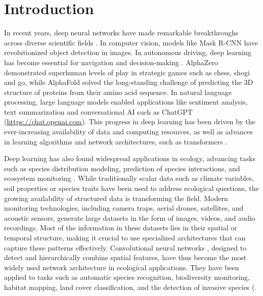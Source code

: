 \documentclass[12pt,twoside]{scrreport}
\begin{document}
\chapter*{Introduction}
\setcounter{page}{1}
In recent years, deep neural networks have made remarkable breakthroughs across diverse scientific fields \citep{jordanMachineLearningTrends2015}. In computer vision, models like Mask R-CNN \citep{heMaskRCNN2017} have revolutionized object detection in images. In autonomous driving, deep learning has become essential for navigation and decision-making \citep{bojarskiEndEndLearning2016}. AlphaZero \citep{silverMasteringChessShogi2017} demonstrated superhuman levels of play in strategic games such as chess, shogi and go, while AlphaFold \citep{jumperHighlyAccurateProtein2021} solved the long-standing challenge of predicting the 3D structure of proteins from their amino acid sequence. In natural language processing, large language models \citep[e.g., GPT-3,][]{brownLanguageModelsAre2020} enabled applications like sentiment analysis, text summarization and conversational AI such as ChatGPT (\url{https://chat.openai.com}). This progress in deep learning has been driven by the ever-increasing availability of data and computing resources, as well as advances in learning algorithms and network architectures, such as transformers \citep{vaswaniAttentionAllYou2017}.

Deep learning has also found widespread applications in ecology, advancing tasks such as species distribution modeling, prediction of species interactions, and ecosystem monitoring \citep{chenEndEndLearningDeep2018, wilkinsonComparisonJointSpecies2019, pichlerMachineLearningAlgorithms2020, pichlerMachineLearningDeep2023, borowiecDeepLearningTool2022, tuiaPerspectivesMachineLearning2022, christinApplicationsDeepLearning2019}. While traditionally scalar data such as climate variables, soil properties or species traits have been used to address ecological questions, the growing availability of structured data is transforming the field. Modern monitoring technologies, including camera traps, aerial drones, satellites, and acoustic sensors, generate large datasets in the form of images, videos, and audio recordings. Most of the information in these datasets lies in their spatial or temporal structure, making it crucial to use specialized architectures that can capture these patterns effectively. Convolutional neural networks \citep[CNNs,]{lecunBackpropagationAppliedHandwritten1989a}, designed to detect and hierarchically combine spatial features, have thus become the most widely used network architecture in ecological applications. They have been applied to tasks such as automatic species recognition, biodiversity monitoring, habitat mapping, land cover classification, and the detection of invasive species (\citep{gomezvillaAutomaticWildAnimal2017, norouzzadehAutomaticallyIdentifyingCounting2018, tabakMachineLearningClassify2019, salamonFusingShallowDeep2017, liDeepLearningRemote2018, kattenbornConvolutionalNeuralNetworks2019, qianUAVDeepConvolutional2020}.
\end{document}
